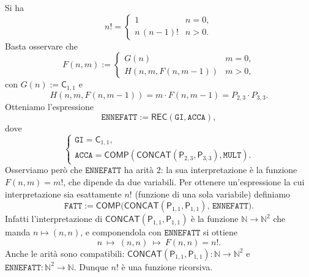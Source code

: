 \begin{sol}
Si ha
\[
n!=
\begin{cases}
1 & n=0,\\
n\,(n-1)! & n>0.
\end{cases}
\]
Basta osservare che
\[
F(n,m):=
\begin{cases}
G(n) & m=0,\\
H(n,m,F(n,m-1)) & m>0,
\end{cases}
\]
con $G(n):=\mathsf C_{1,1}$ e
\[
H(n,m,F(n,m-1))=m\cdot F(n,m-1)=P_{2,3}\cdot P_{3,3}.
\]
Otteniamo l'espressione
\[
\texttt{ENNEFATT}:=\mathsf{REC}(\texttt{GI},\texttt{ACCA}),
\]
dove
\[
\begin{cases}
\texttt{GI}=\mathsf C_{1,1},\\
\texttt{ACCA}=\mathsf{COMP}(\mathsf{CONCAT}(\mathsf P_{2,3},\mathsf P_{3,3}),\texttt{MULT}).
\end{cases}
\]
Osserviamo però che $\texttt{ENNEFATT}$ ha arità $2$: la sua interpretazione è la funzione $F(n,m)=m!$, che dipende da due variabili. Per ottenere un'espressione la cui interpretazione sia esattamente $n!$ (funzione di una sola variabile) definiamo
\[
\texttt{FATT}:=\mathsf{COMP}\big(\mathsf{CONCAT}(\mathsf P_{1,1},\mathsf P_{1,1}),\,\texttt{ENNEFATT}\big).
\]
Infatti l'interpretazione di $\mathsf{CONCAT}(\mathsf P_{1,1},\mathsf P_{1,1})$ è la funzione $\mathbb N\to\mathbb N^2$ che manda $n\mapsto(n,n)$, e componendola con $\texttt{ENNEFATT}$ si ottiene
\[
n\ \longmapsto\ (n,n)\ \longmapsto\ F(n,n)=n!.
\]
Anche le arità sono compatibili: $\mathsf{CONCAT}(\mathsf P_{1,1},\mathsf P_{1,1})\colon\mathbb N\to\mathbb N^2$ e $\texttt{ENNEFATT}\colon\mathbb N^2\to\mathbb N$. Dunque $n!$ è una funzione ricorsiva.
\end{sol}

\newpage

